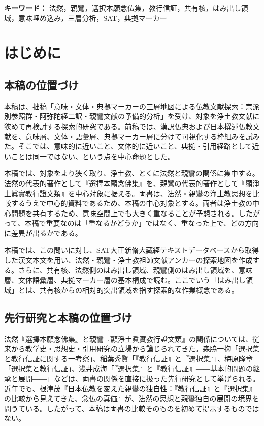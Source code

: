\documentclass[uplatex,dvipdfmx,11pt,a4paper]{jsarticle}
\begin{document}
\noindent\textbf{キーワード：} 法然，親鸞，選択本願念仏集，教行信証，共有核，はみ出し領域，意味埋め込み，三層分析，SAT，典拠マーカー

\section{はじめに}

\subsection{本稿の位置づけ}

本稿は、拙稿「意味・文体・典拠マーカーの三層地図による仏教文献探索：宗派別参照群・阿弥陀経二訳・親鸞文献の予備的分析」\cite{ueyama2026three-layer-map}を受け、対象を浄土教文献に狭めて再検討する探索的研究である。前稿では、漢訳仏典および日本撰述仏教文献を、意味層、文体・語彙層、典拠マーカー層に分けて可視化する枠組みを試みた。そこでは、意味的に近いこと、文体的に近いこと、典拠・引用経路として近いことは同一ではない、という点を中心命題とした。

本稿では、対象をより狭く取り、浄土教、とくに法然と親鸞の関係に集中する。法然の代表的著作として『選擇本願念佛集』を、親鸞の代表的著作として『顯淨土眞實教行證文類』を中心対象に据える。両書は、法然・親鸞の浄土教思想を比較するうえで中心的資料であるため、本稿の中心対象とする。両者は浄土教の中心問題を共有するため、意味空間上でも大きく重なることが予想される。したがって、本稿で重要なのは「重なるかどうか」ではなく、重なった上で、どの方向に差異が出るかである。

本稿では、この問いに対し、SAT大正新脩大藏經テキストデータベースから取得した漢文本文を用い、法然・親鸞・浄土教祖師文献アンカーの探索地図を作成する。さらに、共有核、法然側のはみ出し領域、親鸞側のはみ出し領域を、意味層、文体語彙層、典拠マーカー層の基本構成で読む。ここでいう「はみ出し領域」とは、共有核からの相対的突出領域を指す探索的な作業概念である。

\subsection{先行研究と本稿の位置づけ}

法然『選擇本願念佛集』と親鸞『顯淨土眞實教行證文類』の関係については、従来から教学史・思想史・引用研究の立場から論じられてきた。森脇一掬「選択集と教行信証に関する一考察」\cite{moriwaki1953}、稲葉秀賢「『教行信証』と『選択集』」\cite{inaba1972}、梅原隆章「選択集と教行信証」\cite{umehara1974}、浅井成海「『選択集』と『教行信証』――基本的問題の継承と展開――」\cite{asai2004}などは、両書の関係を直接に扱った先行研究として挙げられる。近年でも、根津茂『日本仏教を変えた親鸞の独自性：『教行信証』と『選択集』の比較から見えてきた、念仏の真価』が、法然の思想と親鸞独自の展開の境界を問うている\cite{nezu2024}。したがって、本稿は両書の比較そのものを初めて提示するものではない。
\end{document}
